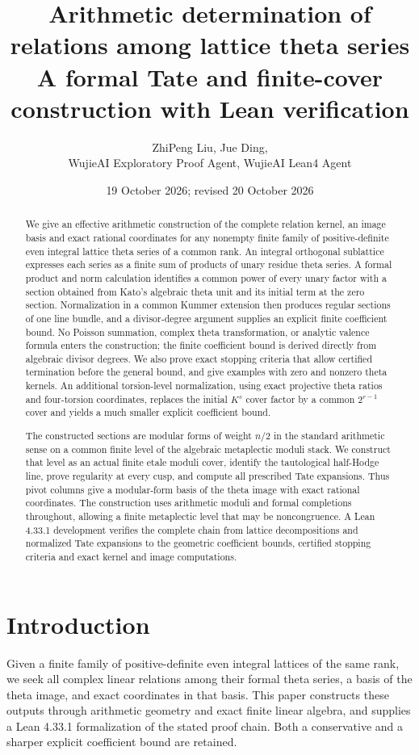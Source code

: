\documentclass[11pt]{article}
\title{Arithmetic determination of relations among lattice theta series\\
\large A formal Tate and finite-cover construction with Lean verification}
\author{ZhiPeng Liu, Jue Ding,\\WujieAI Exploratory Proof Agent, WujieAI Lean4 Agent}
\date{19 October 2026; revised 20 October 2026}
\theoremstyle{remark}\newtheorem{remark}[theorem]{Remark}
\begin{document}
\maketitle
\begin{abstract}
We give an effective arithmetic construction of the complete relation kernel,
an image basis and exact rational coordinates for any nonempty finite family
of positive-definite even integral lattice theta series of a common rank.
An integral orthogonal sublattice expresses each series as a finite sum of
products of unary residue theta series. A formal product and norm calculation
identifies a common power of every unary factor with a section obtained from
Kato's algebraic theta unit and its initial term at the zero section. Normalization in a
common Kummer extension then produces regular sections of one line bundle,
and a divisor-degree argument supplies an explicit finite coefficient bound.
No Poisson summation, complex theta transformation, or analytic valence formula
enters the construction; the finite coefficient bound is derived directly from
algebraic divisor degrees. We also prove exact stopping
criteria that allow certified termination before the general bound, and give
examples with zero and nonzero theta kernels. An additional torsion-level
normalization, using exact projective theta ratios and four-torsion
coordinates, replaces the initial $K^s$ cover factor by a common
$2^{r-1}$ cover and yields a much smaller explicit coefficient bound.

The constructed sections are modular forms of weight $n/2$ in the
standard arithmetic sense on a common finite level of the algebraic
metaplectic moduli stack. We construct that level as an actual finite
etale moduli cover, identify the tautological half-Hodge line, prove
regularity at every cusp, and compute all prescribed Tate expansions.
Thus pivot columns give a modular-form basis of the theta image with
exact rational coordinates. The construction uses arithmetic moduli and
formal completions throughout, allowing a finite metaplectic level that may
be noncongruence. A Lean 4.33.1 development verifies the complete chain from
lattice decompositions and normalized Tate expansions to the geometric
coefficient bounds, certified stopping criteria and exact kernel and image
computations.
\end{abstract}

\section{Introduction}
Given a finite family of positive-definite even integral lattices of the same
rank, we seek all complex linear relations among their formal theta series,
a basis of the theta image, and exact coordinates in that basis. This paper
constructs these outputs through arithmetic geometry and exact finite linear
algebra, and supplies a Lean 4.33.1 formalization of the stated proof chain.
Both a conservative and a sharper explicit coefficient bound are retained.
\end{document}
